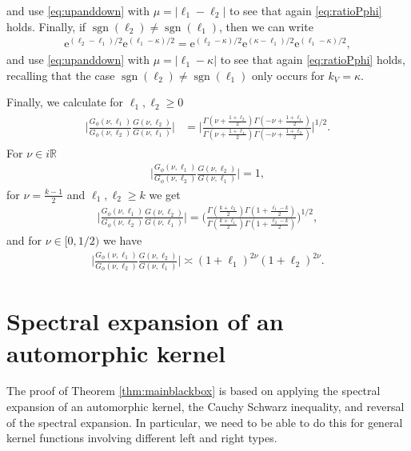 \documentclass[12pt]{amsart}
\theoremstyle{definition}
\theoremstyle{remark}
\numberwithin{equation}{section}
\newcommand{\R}{{\mathbb R}}
\newcommand{\1}{{\mathbf 1}}
\newcommand{\sgn}{\operatorname{sgn}}
\begin{document}
and use \eqref{eq:upanddown} with $\mu=|\ell_1-\ell_2|$ to see that again \eqref{eq:ratioPphi} holds. Finally, if $\sgn(\ell_2) \neq \sgn(\ell_1)$, then we can write
 \begin{align*} 
\mathrm{e}^{(\ell_2-\ell_1)/2}  \mathrm{e}^{(\ell_1-\kappa)/2} = \mathrm{e}^{(\ell_2-\kappa)/2}  \mathrm{e}^{(\kappa-\ell_1)/2} \mathrm{e}^{(\ell_1-\kappa)/2},
\end{align*}
and use \eqref{eq:upanddown} with $\mu=|\ell_1-\kappa|$ to see that again \eqref{eq:ratioPphi} holds, recalling that the case $\sgn(\ell_2) \neq \sgn(\ell_1)$ only occurs for $k_V=\kappa$.


Finally, we calculate for $\ell_1,\ell_2 \geq 0$ 
\begin{align} \label{eq:Gfactor}
\begin{split}
     \bigg| \frac{G_\phi(\nu,\ell_1) }{G_\phi(\nu,\ell_2)} \frac{G(\nu,\ell_2)}{G(\nu,\ell_1) } \bigg| & = \bigg| \frac{\Gamma(\nu + \frac{1+\ell_2}{2})\Gamma(-\nu + \frac{1+\ell_1}{2})}{\Gamma(\nu + \frac{1+\ell_1}{2})\Gamma(-\nu + \frac{1+\ell_2}{2})}\bigg|^{1/2}.
\end{split}
\end{align}
For $\nu\in i\R$
\begin{align}\label{eq:Gfactorregular}
     \bigg| \frac{G_\phi(\nu,\ell_1) }{G_\phi(\nu,\ell_2)} \frac{G(\nu,\ell_2)}{G(
    \nu,\ell_1) } \bigg| =1,
\end{align}
for $\nu= \frac{k-1}{2}$ and $\ell_1,\ell_2 \geq k$ we get
\begin{align}\label{eq:Gfactorholo}
     \bigg| \frac{G_\phi(\nu,\ell_1) }{G_\phi(\nu,\ell_2)} \frac{G(\nu,\ell_2)}{G(\nu,\ell_1) } \bigg| = \bigg( \frac{\Gamma( \frac{k+\ell_2}{2})\Gamma(1+ \frac{\ell_1-k}{2})}{\Gamma( \frac{k+\ell_1}{2})\Gamma(1+ \frac{\ell_2-k}{2})}\bigg)^{1/2},
\end{align}
and for $\nu \in [0,1/2)$ we have
\begin{align}\label{eq:Gfactorexcep}
     \bigg| \frac{G_\phi(\nu,\ell_1) }{G_\phi(\nu,\ell_2)} \frac{G(\nu,\ell_2)}{G(\nu,\ell_1) } \bigg| \asymp (1+\ell_1)^{2\nu}(1+\ell_2)^{2\nu}.
\end{align}



\section{Spectral expansion of an automorphic kernel} \label{sec:specautokern}
The proof of Theorem \ref{thm:mainblackbox} is based on applying the spectral expansion of an automorphic kernel, the Cauchy Schwarz inequality, and reversal of the spectral expansion. In particular, we need to be able to do this for general kernel functions involving different left and right types. 
\end{document}
